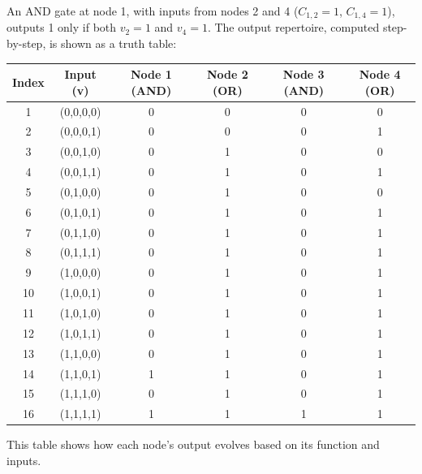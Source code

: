 \documentclass[12pt]{article}
\begin{document}
An AND gate at node 1, with inputs from nodes 2 and 4 (\( C_{1,2} = 1 \), \( C_{1,4} = 1 \)), outputs 1 only if both \( v_2 = 1 \) and \( v_4 = 1 \). The output repertoire, computed step-by-step, is shown as a truth table:
\begin{center}
\begin{tabular}{c|c|c|c|c|c}
\textbf{Index} & \textbf{Input (v)} & \textbf{Node 1 (AND)} & \textbf{Node 2 (OR)} & \textbf{Node 3 (AND)} & \textbf{Node 4 (OR)} \\
\hline
1 & (0,0,0,0) & 0 & 0 & 0 & 0 \\
2 & (0,0,0,1) & 0 & 0 & 0 & 1 \\
3 & (0,0,1,0) & 0 & 1 & 0 & 0 \\
4 & (0,0,1,1) & 0 & 1 & 0 & 1 \\
5 & (0,1,0,0) & 0 & 1 & 0 & 0 \\
6 & (0,1,0,1) & 0 & 1 & 0 & 1 \\
7 & (0,1,1,0) & 0 & 1 & 0 & 1 \\
8 & (0,1,1,1) & 0 & 1 & 0 & 1 \\
9 & (1,0,0,0) & 0 & 1 & 0 & 1 \\
10 & (1,0,0,1) & 0 & 1 & 0 & 1 \\
11 & (1,0,1,0) & 0 & 1 & 0 & 1 \\
12 & (1,0,1,1) & 0 & 1 & 0 & 1 \\
13 & (1,1,0,0) & 0 & 1 & 0 & 1 \\
14 & (1,1,0,1) & 1 & 1 & 0 & 1 \\
15 & (1,1,1,0) & 0 & 1 & 0 & 1 \\
16 & (1,1,1,1) & 1 & 1 & 1 & 1 \\
\end{tabular}
\end{center}
This table shows how each node’s output evolves based on its function and inputs.
\end{document}

